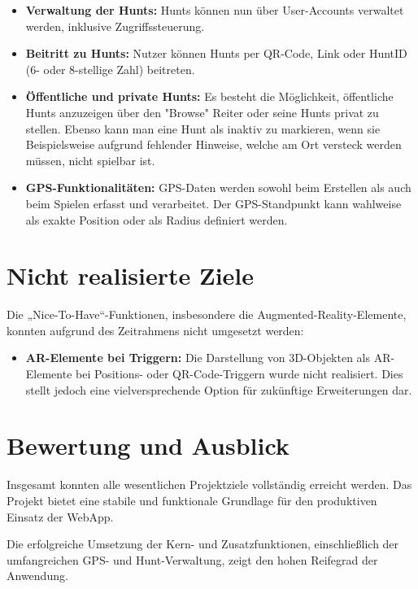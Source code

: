 \documentclass[oneside]{ausarbeitung}
\begin{document}
\begin{itemize}
  \item \textbf{Verwaltung der Hunts:} Hunts können nun über User-Accounts verwaltet werden, inklusive Zugriffssteuerung.  
  \item \textbf{Beitritt zu Hunts:} Nutzer können Hunts per QR-Code, Link oder HuntID (6- oder 8-stellige Zahl) beitreten. 
  \item \textbf{Öffentliche und private Hunts:} Es besteht die Möglichkeit, öffentliche Hunts anzuzeigen über den "Browse" Reiter oder seine Hunts privat zu stellen. Ebenso kann man eine Hunt als inaktiv zu markieren, wenn sie Beispielsweise aufgrund fehlender Hinweise, welche am Ort versteck werden müssen, nicht spielbar ist.
  \item \textbf{GPS-Funktionalitäten:} GPS-Daten werden sowohl beim Erstellen als auch beim Spielen erfasst und verarbeitet. Der GPS-Standpunkt kann wahlweise als exakte Position oder als Radius definiert werden. 
\end{itemize}

\section{Nicht realisierte Ziele}

Die „Nice-To-Have“-Funktionen, insbesondere die Augmented-Reality-Elemente, konnten aufgrund des Zeitrahmens nicht umgesetzt werden:  

\begin{itemize}
  \item \textbf{AR-Elemente bei Triggern:} Die Darstellung von 3D-Objekten als AR-Elemente bei Positions- oder QR-Code-Triggern wurde nicht realisiert.  
  Dies stellt jedoch eine vielversprechende Option für zukünftige Erweiterungen dar.  
\end{itemize}

\section{Bewertung und Ausblick}

Insgesamt konnten alle wesentlichen Projektziele vollständig erreicht werden.  
Das Projekt bietet eine stabile und funktionale Grundlage für den produktiven Einsatz der WebApp.  

Die erfolgreiche Umsetzung der Kern- und Zusatzfunktionen, einschließlich der umfangreichen GPS- und Hunt-Verwaltung, zeigt den hohen Reifegrad der Anwendung.  
\end{document}

